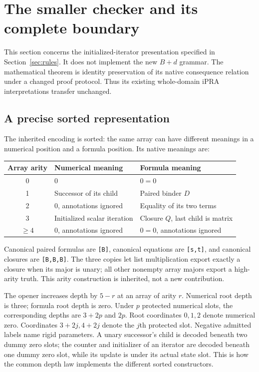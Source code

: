 \section{The smaller checker and its complete boundary}
\label{sec:checker}

This section concerns the initialized-iterator presentation specified in
Section~\ref{sec:rules}. It does not implement the new $B+d$ grammar.
The mathematical theorem is identity preservation of its native
consequence relation under a changed proof protocol. Thus its existing
whole-domain iPRA interpretations transfer unchanged.

\subsection{A precise sorted representation}
The inherited encoding is sorted: the same array can have different
meanings in a numerical position and a formula position. Its native
meanings are:
\begin{center}\small
\begin{tabular}{cll}
\toprule
Array arity & Numerical meaning & Formula meaning\\\midrule
0 & $0$ & $0=0$\\
1 & Successor of its child & Paired binder $D$\\
2 & $0$, annotations ignored & Equality of its two terms\\
3 & Initialized scalar iteration & Closure $Q$, last child is matrix\\
$\ge4$ & $0$, annotations ignored & $0=0$, annotations ignored\\
\bottomrule
\end{tabular}
\end{center}
Canonical paired formulas are \texttt{[B]}, canonical equations are
\texttt{[s,t]}, and canonical closures are \texttt{[B,B,B]}. The three
copies let list multiplication export exactly a closure when its major
is unary; all other nonempty array majors export a high-arity truth.
This arity construction is inherited, not a new contribution.\cite{arity}

The opener increases depth by $5-r$ at an array of arity $r$. Numerical
root depth is three; formula root depth is zero. Under $p$ protected
numerical slots, the corresponding depths are $3+2p$ and $2p$. Root
coordinates $0,1,2$ denote numerical zero. Coordinates $3+2j,4+2j$ denote
the $j$th protected slot. Negative admitted labels name rigid parameters.
A unary successor's child is decoded beneath two dummy zero slots;
the counter and initializer of an iterator are decoded beneath one dummy
zero slot, while its update is under its actual state slot. This is how
the common depth law implements the different sorted constructors.

